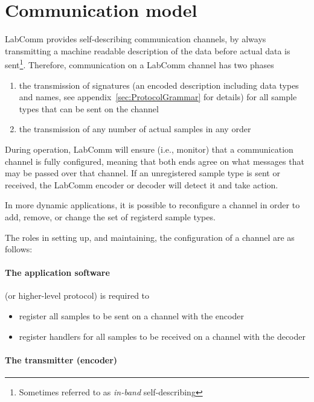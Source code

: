 \documentclass[a4paper]{article}
\begin{document}
\section{Communication model}

LabComm provides self-describing communication channels, by always transmitting
a machine readable description of the data before actual data is
sent\footnote{Sometimes referred to as \emph{in-band} self-describing}. 
Therefore, communication on a LabComm channel has two phases

\begin{enumerate}
\item the transmission of signatures (an encoded description including data
types and names, see appendix~\ref{sec:ProtocolGrammar} for details) for all sample types
that can be sent on the channel
\item the transmission of any number of actual samples in any order
\end{enumerate}

During operation, LabComm will ensure (i.e., monitor) that a communication
channel is fully configured, meaning that both ends agree on what messages that
may be passed over that channel.  If an unregistered sample type is sent or
received, the LabComm encoder or decoder will detect it and take action.

In more dynamic applications, it is possible to reconfigure a channel in order to add,
remove, or change the set of registerd sample types.

The roles in setting up, and maintaining, the configuration of a channel are as follows:

\paragraph{The application software} (or higher-level protocol) is required to

\begin{itemize}
\item register all samples to be sent on a channel with the encoder
\item register handlers for all samples to be received  on a channel with the decoder
\end{itemize}

\paragraph{The transmitter (encoder)}
\end{document}

